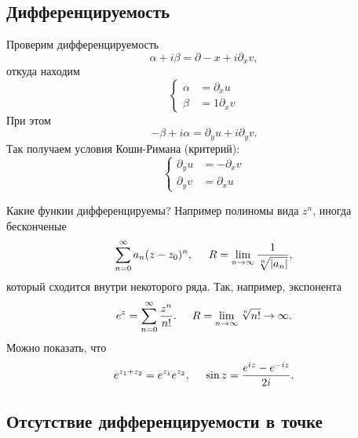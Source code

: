 
\subsection*{Дифференцируемость}


Проверим дифференцируемость
\begin{equation*}
    \alpha + i \beta = \partial-x  + i \partial_x v,
\end{equation*}
откуда находим
\begin{equation*}
    \left\{\begin{aligned}
        \alpha &= \partial_x u \\
        \beta &=1 \partial_x v
    \end{aligned}\right.
\end{equation*}
При этом
\begin{equation*}
    - \beta + i \alpha  =\partial_y u + i \partial_y v.
\end{equation*}
Так получаем условия Коши-Римана (критерий):
\begin{equation*}
    \left\{\begin{aligned}
        \partial_y u &= - \partial_x v \\
        \partial_y v &= \partial_x u
    \end{aligned}\right.
\end{equation*}


Какие функии дифференцируемы? Например полиномы вида $z^n$, иногда бесконченые
\begin{equation*}
    \sum_{n=0}^{\infty} a_n (z-z_0)^n,
    \hspace{5 mm} 
    R = \lim_{n \to \infty} \frac{1}{\sqrt[n]{|a_n|}},
\end{equation*}
который сходится внутри некоторого ряда. Так, например, экспонента
\begin{equation*}
    e^z = \sum_{n=0}^{\infty} \frac{z^n}{n!}. \hspace{5 mm} 
    R = \lim_{n \to \infty} \sqrt[n]{n!} \to \infty.
\end{equation*}
Можно показать, что
\begin{equation*}
    e^{z_1 + z_2} = e^{z_1} e^{z_2}, 
    \hspace{5 mm} 
    \sin z = \frac{e^{iz}-e^{-iz}}{2i}.
\end{equation*}




\subsection*{Отсутствие дифференцируемости в точке}


